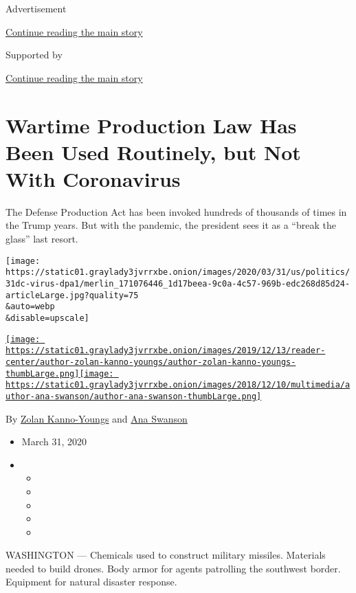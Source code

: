 Advertisement

\protect\hyperlink{after-top}{Continue reading the main story}

Supported by

\protect\hyperlink{after-sponsor}{Continue reading the main story}

\hypertarget{wartime-production-law-has-been-used-routinely-but-not-with-coronavirus}{%
\section{Wartime Production Law Has Been Used Routinely, but Not With
Coronavirus}\label{wartime-production-law-has-been-used-routinely-but-not-with-coronavirus}}

The Defense Production Act has been invoked hundreds of thousands of
times in the Trump years. But with the pandemic, the president sees it
as a ``break the glass'' last resort.

\texttt{[image: https://static01.graylady3jvrrxbe.onion/images/2020/03/31/us/politics/31dc-virus-dpa1/merlin\_171076446\_1d17beea-9c0a-4c57-969b-edc268d85d24-articleLarge.jpg?quality=75\\\&auto=webp\\\&disable=upscale]}

\href{https://www.nytimes3xbfgragh.onion/by/zolan-kanno-youngs}{\texttt{[image: https://static01.graylady3jvrrxbe.onion/images/2019/12/13/reader-center/author-zolan-kanno-youngs/author-zolan-kanno-youngs-thumbLarge.png]}}\href{https://www.nytimes3xbfgragh.onion/by/ana-swanson}{\texttt{[image: https://static01.graylady3jvrrxbe.onion/images/2018/12/10/multimedia/author-ana-swanson/author-ana-swanson-thumbLarge.png]}}

By \href{https://www.nytimes3xbfgragh.onion/by/zolan-kanno-youngs}{Zolan
Kanno-Youngs} and
\href{https://www.nytimes3xbfgragh.onion/by/ana-swanson}{Ana Swanson}

\begin{itemize}
\item
  March 31, 2020
\item
  \begin{itemize}
  \item
  \item
  \item
  \item
  \item
  \end{itemize}
\end{itemize}

WASHINGTON --- Chemicals used to construct military missiles. Materials
needed to build drones. Body armor for agents patrolling the southwest
border. Equipment for natural disaster response.

